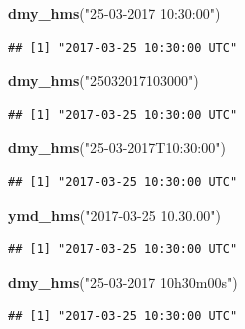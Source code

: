 \documentclass[]{tufte-book}
\newenvironment{Shaded}{}{}
\newcommand{\KeywordTok}[1]{\textcolor[rgb]{0.00,0.44,0.13}{\textbf{#1}}}
\newcommand{\NormalTok}[1]{#1}
\newcommand{\StringTok}[1]{\textcolor[rgb]{0.25,0.44,0.63}{#1}}
\begin{document}
\begin{Shaded}
\begin{Highlighting}[]
\KeywordTok{dmy_hms}\NormalTok{(}\StringTok{"25-03-2017 10:30:00"}\NormalTok{)}
\end{Highlighting}
\end{Shaded}

\begin{verbatim}
## [1] "2017-03-25 10:30:00 UTC"
\end{verbatim}

\begin{Shaded}
\begin{Highlighting}[]
\KeywordTok{dmy_hms}\NormalTok{(}\StringTok{"25032017103000"}\NormalTok{)}
\end{Highlighting}
\end{Shaded}

\begin{verbatim}
## [1] "2017-03-25 10:30:00 UTC"
\end{verbatim}

\begin{Shaded}
\begin{Highlighting}[]
\KeywordTok{dmy_hms}\NormalTok{(}\StringTok{"25-03-2017T10:30:00"}\NormalTok{)}
\end{Highlighting}
\end{Shaded}

\begin{verbatim}
## [1] "2017-03-25 10:30:00 UTC"
\end{verbatim}

\begin{Shaded}
\begin{Highlighting}[]
\KeywordTok{ymd_hms}\NormalTok{(}\StringTok{"2017-03-25 10.30.00"}\NormalTok{)}
\end{Highlighting}
\end{Shaded}

\begin{verbatim}
## [1] "2017-03-25 10:30:00 UTC"
\end{verbatim}

\begin{Shaded}
\begin{Highlighting}[]
\KeywordTok{dmy_hms}\NormalTok{(}\StringTok{"25-03-2017 10h30m00s"}\NormalTok{)}
\end{Highlighting}
\end{Shaded}

\begin{verbatim}
## [1] "2017-03-25 10:30:00 UTC"
\end{verbatim}
\end{document}
